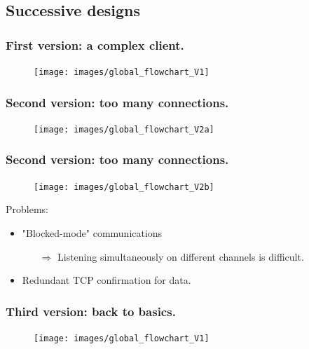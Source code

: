 \documentclass{beamer}
\begin{document}

\subsection{Successive designs}
\begin{frame}
\frametitle{First version: a complex client.}
\begin{figure}
	\texttt{[image: images/global\_flowchart\_V1]}
\end{figure}
\end{frame}

\begin{frame}
\frametitle{Second version: too many connections.}
\begin{figure}
	\texttt{[image: images/global\_flowchart\_V2a]}
\end{figure}
\end{frame}

\begin{frame}
\frametitle{Second version: too many connections.}
\begin{figure}
	\texttt{[image: images/global\_flowchart\_V2b]}
\end{figure}
\end{frame}

\begin{frame}

Problems:
\begin{itemize}
	\item "Blocked-mode" communications
	\begin{itemize}
		\item[$\Rightarrow$] Listening simultaneously on different channels is difficult.
	\end{itemize}
	\item[]
	\item Redundant TCP confirmation for data.
\end{itemize}

\end{frame}


\begin{frame}
\frametitle{Third version: back to basics.}
\begin{figure}
	\texttt{[image: images/global\_flowchart\_V1]}
\end{figure}
\end{frame}

\section{}
\end{document}
